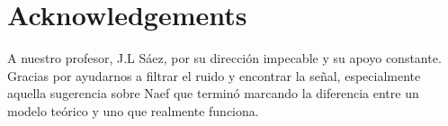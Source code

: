 \section*{Acknowledgements}
A nuestro profesor, J.L Sáez, por su dirección impecable y su apoyo constante. Gracias por ayudarnos a filtrar el ruido y encontrar la señal, especialmente aquella sugerencia sobre Naef que terminó marcando la diferencia entre un modelo teórico y uno que realmente funciona.